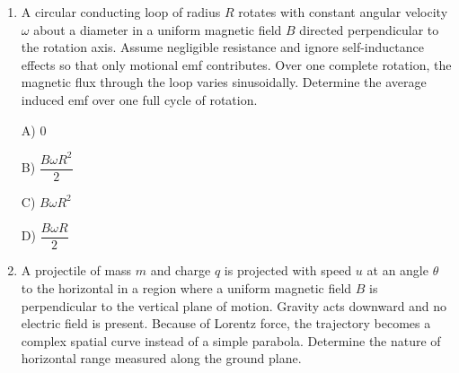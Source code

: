 \documentclass[12pt]{article}
\begin{document}
\begin{enumerate}
A) finite

B) diverges logarithmically

C) proportional to amplitude

D) constant

\item 

A circular conducting loop of radius $R$ rotates with constant angular velocity $\omega$ about a diameter in a uniform magnetic field $B$ directed perpendicular to the rotation axis. 
Assume negligible resistance and ignore self-inductance effects so that only motional emf contributes. 
Over one complete rotation, the magnetic flux through the loop varies sinusoidally. 
Determine the average induced emf over one full cycle of rotation.

\begin{center}
\end{center}


A) $0$

B) $\dfrac{B\omega R^2}{2}$

C) $B\omega R^2$

D) $\dfrac{B\omega R}{2}$

\item

A projectile of mass $m$ and charge $q$ is projected with speed $u$ at an angle $\theta$ to the horizontal in a region where a uniform magnetic field $B$ is perpendicular to the vertical plane of motion. 
Gravity acts downward and no electric field is present. 
Because of Lorentz force, the trajectory becomes a complex spatial curve instead of a simple parabola. 
Determine the nature of horizontal range measured along the ground plane.


\end{enumerate}
\end{document}

